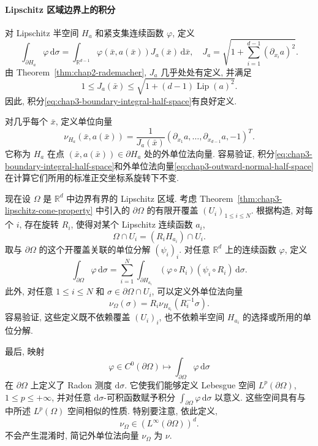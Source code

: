 \paragraph{Lipschitz 区域边界上的积分}

对 Lipschitz 半空间 $H_a$ 和紧支集连续函数 $\varphi$, 定义
\begin{equation}
 \int_{\partial H_a}\varphi\,\mathrm{d}\sigma
 =\int_{\mathbb{R}^{d-1}}\varphi(\bar x,a(\bar x))J_a(\bar x)\,\mathrm{d}\bar x,
 \quad
 J_a=\sqrt{1+\sum_{i=1}^{d-1}(\partial_{x_i}a)^2}.
 \label{eq:chap3-boundary-integral-half-space}
\end{equation}
由 Theorem~\ref{thm:chap2-rademacher}, $J_a$ 几乎处处有定义, 并满足
\[
 1\leq J_a(\bar x)\leq\sqrt{1+(d-1)\operatorname{Lip}(a)^2}.
\]
因此, 积分\eqref{eq:chap3-boundary-integral-half-space}有良好定义.

对几乎每个 $\bar x$, 定义单位向量
\begin{equation}
 \nu_{H_a}(\bar x,a(\bar x))
 =\frac1{J_a(\bar x)}
 (\partial_{x_1}a,\ldots,\partial_{x_{d-1}}a,-1)^T.
 \label{eq:chap3-outward-normal-half-space}
\end{equation}
它称为 $H_a$ 在点 $(\bar x,a(\bar x))\in\partial H_a$ 处的外单位法向量. 容易验证, 积分\eqref{eq:chap3-boundary-integral-half-space}和外单位法向量\eqref{eq:chap3-outward-normal-half-space}在计算它们所用的标准正交坐标系旋转下不变.

现在设 $\Omega$ 是 $\mathbb R^d$ 中边界有界的 Lipschitz 区域. 考虑 Theorem~\ref{thm:chap3-lipschitz-cone-property} 中引入的 $\partial\Omega$ 的有限开覆盖 $(U_i)_{1\leq i\leq N}$. 根据构造, 对每个 $i$, 存在旋转 $R_i$, 使得对某个 Lipschitz 连续函数 $a_i$,
\[
 \Omega\cap U_i=(R_iH_{a_i})\cap U_i.
\]
取与 $\partial\Omega$ 的这个开覆盖关联的单位分解 $(\psi_i)_i$. 对任意 $\mathbb R^d$ 上的连续函数 $\varphi$, 定义
\[
 \int_{\partial\Omega}\varphi\,\mathrm d\sigma
 =\sum_{i=1}^N\int_{\partial H_{a_i}}
 (\varphi\circ R_i)(\psi_i\circ R_i)\,\mathrm d\sigma.
\]
此外, 对任意 $1\leq i\leq N$ 和 $\sigma\in\partial\Omega\cap U_i$, 可以定义外单位法向量
\[
 \nu_\Omega(\sigma)=R_i\nu_{H_{a_i}}(R_i^{-1}\sigma).
\]
容易验证, 这些定义既不依赖覆盖 $(U_i)_i$, 也不依赖半空间 $H_{a_i}$ 的选择或所用的单位分解.

最后, 映射
\[
 \varphi\in C^0(\partial\Omega)
 \longmapsto\int_{\partial\Omega}\varphi\,\mathrm d\sigma
\]
在 $\partial\Omega$ 上定义了 Radon 测度 $\mathrm d\sigma$. 它使我们能够定义 Lebesgue 空间 $L^p(\partial\Omega)$, $1\leq p\leq+\infty$, 并对任意 $\mathrm d\sigma$-可积函数赋予积分 $\int_{\partial\Omega}\varphi\,\mathrm d\sigma$ 以意义. 这些空间具有与中所述 $L^p(\Omega)$ 空间相似的性质. 特别要注意, 依此定义,
\[
 \nu_\Omega\in(L^\infty(\partial\Omega))^d.
\]
不会产生混淆时, 简记外单位法向量 $\nu_\Omega$ 为 $\nu$.

